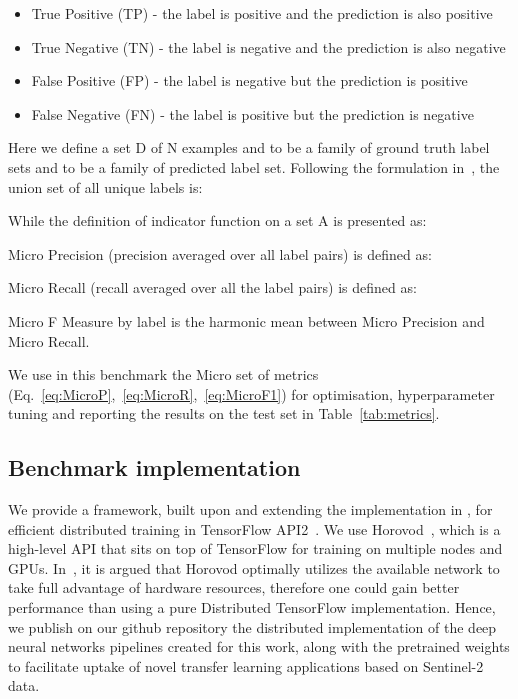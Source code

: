 \documentclass[journal]{IEEEtran}
\begin{document}
\begin{itemize}
    \item True Positive (TP) - the label is positive and the prediction is also positive
    \item True Negative (TN) - the label is negative and the prediction is also negative
    \item False Positive (FP) - the label is negative but the prediction is positive
    \item False Negative (FN) - the label is positive but the prediction is negative
\end{itemize}

Here we define a set D of N examples and  to be a family of ground truth label sets and  to be a family of predicted label set. Following the formulation in~\cite{6471714}, the union set of all unique labels is:



While the definition of indicator function  on a set A is presented as:









Micro Precision (precision averaged over all label pairs) is defined as:



Micro Recall (recall averaged over all the label pairs) is defined as:


Micro F Measure by label is the harmonic mean between Micro Precision and Micro Recall.


We use in this benchmark the Micro set of metrics (Eq.~\ref{eq:MicroP},~\ref{eq:MicroR},~\ref{eq:MicroF1}) for optimisation, hyperparameter tuning and reporting the results on the test set in Table~\ref{tab:metrics}.

\subsection{Benchmark implementation}
\label{sec:distributed}

We provide a framework, built upon and extending the implementation in \cite{sumbul2020bigearthnet}, for efficient distributed training in TensorFlow API2~\citep{199317}. 
We use Horovod~\citep{sergeev2018horovod}, which is a high-level API that sits on top of TensorFlow for training on multiple nodes and GPUs. In~\cite{sergeev2018horovod}, it is argued that Horovod optimally utilizes the available network to take full advantage of hardware  resources, therefore one could gain better performance than using a pure Distributed TensorFlow implementation. 
Hence, we publish on our github repository the distributed implementation of the deep neural networks pipelines created for this work, along with the pretrained weights to facilitate uptake of novel transfer learning applications based on Sentinel-2 data. 
\end{document}
